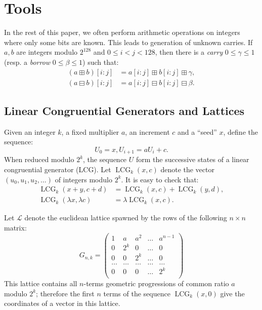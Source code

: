 \documentclass[journal=tosc,final]{iacrtrans}
\DeclareMathOperator{\LCG}{LCG}
\begin{document}
\section{Tools}
\label{sec:geometric}

In the rest of this paper, we often perform arithmetic operations on integers
where only some bits are known. This leads to generation of unknown carries. If
$a, b$ are integers modulo $2^{128}$ and $0\leq i<j<128$, then there is a
\emph{carry} $0 \leq \gamma \leq 1$ (resp. a \emph{borrow}
$0 \leq \beta \leq 1$) such that:
\begin{align}
  (a \boxplus b)[i:j]  &= a[i:j] \boxplus  b[i:j] \boxplus  \gamma, \label{eq:caryy}  \\
  (a \boxminus b)[i:j] &= a[i:j] \boxminus b[i:j] \boxminus \beta.  \label{eq:borrow}
\end{align}

\subsection{Linear Congruential Generators and Lattices}

Given an integer $k$, a fixed multiplier $a$, an increment $c$ and a ``seed''
$x$, define the sequence:
\[
  U_0 = x, U_{i+1} = a U_i + c.
\]
When reduced modulo $2^k$, the sequence $U$ form the successive states of a
linear congruential generator (LCG). Let $\LCG_{k}(x, c)$ denote the vector
$(u_0, u_1, u_2, \dots)$ of integers modulo $2^k$. It is easy to check that:
\begin{align}
\label{eq:lcg-additive}
\LCG_{k}(x + y, c + d) &= \LCG_{k}(x, c) + \LCG_{k}(y, d),  \\
\label{eq:lcg-scalar}
\LCG_{k}(\lambda x, \lambda c) &= \lambda \LCG_{k}(x, c).   
\end{align}

Let $\mathcal{L}$ denote the euclidean lattice spawned by the rows of the
following $n\times n$ matrix:
\[
  G_{n,k} = \begin{pmatrix}
    1 & a   & a^2 & \dots & a^{n-1} \\
    0 & 2^k & 0   & \dots & 0 \\
    0 & 0   & 2^k & \dots & 0 \\
    \dots & \dots & \dots & \dots & \dots\\
    0 & 0 & 0 & \dots & 2^k \\
  \end{pmatrix}
\]
This lattice contains all $n$-terms geometric progressions of common ratio $a$
modulo $2^k$; therefore the first $n$ terms of the sequence $\LCG_{k}(x, 0)$
give the coordinates of a vector in this lattice.
\end{document}
